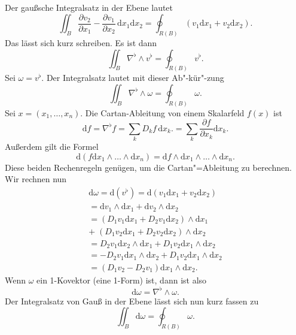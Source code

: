 \documentclass[a4paper,11pt,fleqn,twocolumn,twoside]{scrartcl}
\numberwithin{equation}{section}
\begin{document}
Der gaußsche Integralsatz in der Ebene lautet
\begin{equation}
\iint_B \frac{\partial v_2}{\partial x_1}
- \frac{\partial v_1}{\partial x_2}\,\mathrm dx_1\mathrm dx_2
= \oint_{R(B)} (v_1\mathrm dx_1+v_2\mathrm dx_2).
\end{equation} 
Das lässt sich kurz schreiben. Es ist dann
\begin{equation}
\iint_B \nabla^\flat\wedge v^\flat = \oint_{R(B)}  v^\flat.
\end{equation}
Sei $\omega= v^\flat$.
Der Integralsatz lautet mit dieser Ab"-kür"-zung
\begin{equation}
\iint_B \nabla^\flat\wedge\omega
= \oint_{R(B)} \omega.
\end{equation}
%
Sei $x=(x_1,\ldots,x_n)$.
Die Cartan-Ableitung von einem Skalarfeld $f(x)$ ist
\begin{equation}
\mathrm df = \nabla^\flat f
= \sum_{k} D_k f\,\mathrm dx_k.
= \sum_{k} \frac{\partial f}{\partial x_k}\mathrm dx_k.
\end{equation}
Außerdem gilt die Formel
\begin{equation}
\mathrm d(f\mathrm dx_1\wedge\ldots\wedge\mathrm dx_n)
= \mathrm df\wedge\mathrm dx_1\wedge\ldots\wedge\mathrm dx_n.
\end{equation}
Diese beiden Rechenregeln genügen, um die Cartan"=Ableitung
zu berechnen. Wir rechnen nun
\begin{gather*}
\mathrm d\omega
= \mathrm d(v^\flat)
= \mathrm d(v_1\mathrm dx_1+v_2\mathrm dx_2)\\
= \mathrm dv_1\wedge\mathrm dx_1+\mathrm dv_2\wedge\mathrm dx_2\\
= (D_1v_1\mathrm dx_1+D_2v_1\mathrm dx_2)\wedge\mathrm dx_1\\
+\;(D_1v_2\mathrm dx_1+D_2v_2\mathrm dx_2)\wedge\mathrm dx_2\\
= D_2v_1\mathrm dx_2\wedge\mathrm dx_1
+ D_1v_2\mathrm dx_1\wedge\mathrm dx_2\\
= -D_2v_1\mathrm dx_1\wedge\mathrm dx_2
+ D_1v_2\mathrm dx_1\wedge\mathrm dx_2\\
= (D_1v_2-D_2v_1)\mathrm dx_1\wedge\mathrm dx_2.
\end{gather*}
Wenn $\omega$ ein 1-Kovektor (eine 1-Form) ist, dann ist also
\begin{equation}
\mathrm d\omega
= \nabla^\flat\wedge\omega.
\end{equation}
Der Integralsatz von Gauß in der Ebene lässt sich nun kurz fassen zu
\begin{equation}
\iint_B \mathrm d\omega
= \oint_{R(B)}\omega.
\end{equation}
\end{document}
